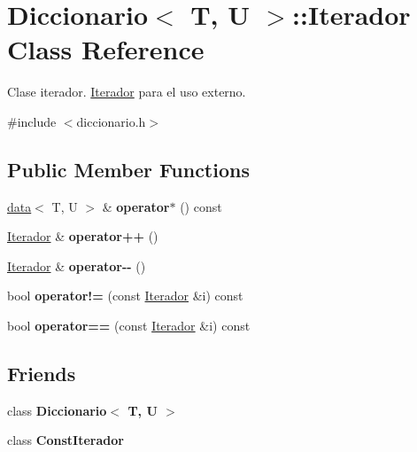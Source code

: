 \hypertarget{classDiccionario_1_1Iterador}{}\section{Diccionario$<$ T, U $>$\+:\+:Iterador Class Reference}
\label{classDiccionario_1_1Iterador}


Clase iterador. \hyperlink{classDiccionario_1_1Iterador}{Iterador} para el uso externo.  




{\ttfamily \#include $<$diccionario.\+h$>$}

\subsection*{Public Member Functions}
\begin{DoxyCompactItemize}
\item 
\mbox{\label{classDiccionario_1_1Iterador_a552bbd9e8fbc48f610f6bf9724dc10e2}} 
\hyperlink{structdata}{data}$<$ T, U $>$ \& {\bfseries operator$\ast$} () const
\item 
\mbox{\label{classDiccionario_1_1Iterador_ae0711dddaf1365635c99be0c2ddfbf55}} 
\hyperlink{classDiccionario_1_1Iterador}{Iterador} \& {\bfseries operator++} ()
\item 
\mbox{\label{classDiccionario_1_1Iterador_ad6f75667ff59298cab30768bb0723472}} 
\hyperlink{classDiccionario_1_1Iterador}{Iterador} \& {\bfseries operator-\/-\/} ()
\item 
\mbox{\label{classDiccionario_1_1Iterador_af1e39be70a92da05808017c460fc2167}} 
bool {\bfseries operator!=} (const \hyperlink{classDiccionario_1_1Iterador}{Iterador} \&i) const
\item 
\mbox{\label{classDiccionario_1_1Iterador_a19b36e539c164f82c4e4f58a44fd1bb1}} 
bool {\bfseries operator==} (const \hyperlink{classDiccionario_1_1Iterador}{Iterador} \&i) const
\end{DoxyCompactItemize}
\subsection*{Friends}
\begin{DoxyCompactItemize}
\item 
\mbox{\label{classDiccionario_1_1Iterador_ae50c4dcf749ac5c49596da52815dfa85}} 
class {\bfseries Diccionario$<$ T, U $>$}
\item 
\mbox{\label{classDiccionario_1_1Iterador_ab9064d3689232b6232bedd3a17920205}} 
class {\bfseries Const\+Iterador}
\end{DoxyCompactItemize}


